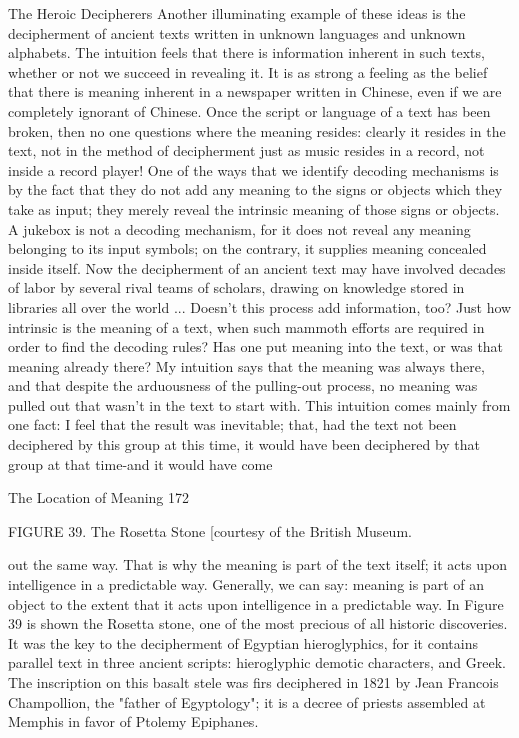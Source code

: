                               The Heroic Decipherers
Another illuminating example of these ideas is the decipherment of ancient texts written
in unknown languages and unknown alphabets. The intuition feels that there is
information inherent in such texts, whether or not we succeed in revealing it. It is as
strong a feeling as the belief that there is meaning inherent in a newspaper written in
Chinese, even if we are completely ignorant of Chinese. Once the script or language of a
text has been broken, then no one questions where the meaning resides: clearly it resides
in the text, not in the method of decipherment just as music resides in a record, not inside
a record player! One of the ways that we identify decoding mechanisms is by the fact that
they do not add any meaning to the signs or objects which they take as input; they merely
reveal the intrinsic meaning of those signs or objects. A jukebox is not a decoding
mechanism, for it does not reveal any meaning belonging to its input symbols; on the
contrary, it supplies meaning concealed inside itself.
         Now the decipherment of an ancient text may have involved decades of labor by
several rival teams of scholars, drawing on knowledge stored in libraries all over the
world ... Doesn't this process add information, too? Just how intrinsic is the meaning of a
text, when such mammoth efforts are required in order to find the decoding rules? Has
one put meaning into the text, or was that meaning already there? My intuition says that
the meaning was always there, and that despite the arduousness of the pulling-out
process, no meaning was pulled out that wasn't in the text to start with. This intuition
comes mainly from one fact: I feel that the result was inevitable; that, had the text not
been deciphered by this group at this time, it would have been deciphered by that group
at that time-and it would have come




The Location of Meaning                                                                 172

               FIGURE 39. The Rosetta Stone [courtesy of the British Museum.

out the same way. That is why the meaning is part of the text itself; it acts upon
intelligence in a predictable way. Generally, we can say: meaning is part of an object to
the extent that it acts upon intelligence in a predictable way.
        In Figure 39 is shown the Rosetta stone, one of the most precious of all historic
discoveries. It was the key to the decipherment of Egyptian hieroglyphics, for it contains
parallel text in three ancient scripts: hieroglyphic demotic characters, and Greek. The
inscription on this basalt stele was firs deciphered in 1821 by Jean Francois Champollion,
the "father of Egyptology"; it is a decree of priests assembled at Memphis in favor of
Ptolemy Epiphanes.




